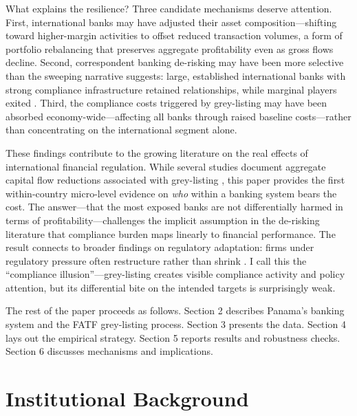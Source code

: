 \documentclass[12pt]{article}
\begin{document}
What explains the resilience? Three candidate mechanisms deserve attention. First, international banks may have adjusted their asset composition---shifting toward higher-margin activities to offset reduced transaction volumes, a form of portfolio rebalancing that preserves aggregate profitability even as gross flows decline. Second, correspondent banking de-risking may have been more selective than the sweeping narrative suggests: large, established international banks with strong compliance infrastructure retained relationships, while marginal players exited \citep{erbenova2016,accuity2017}. Third, the compliance costs triggered by grey-listing may have been absorbed economy-wide---affecting all banks through raised baseline costs---rather than concentrating on the international segment alone.

These findings contribute to the growing literature on the real effects of international financial regulation. While several studies document aggregate capital flow reductions associated with grey-listing \citep{nkusu2023,collin2022,johannesen2014,masciandaro2022}, this paper provides the first within-country micro-level evidence on \textit{who} within a banking system bears the cost. The answer---that the most exposed banks are not differentially harmed in terms of profitability---challenges the implicit assumption in the de-risking literature that compliance burden maps linearly to financial performance. The result connects to broader findings on regulatory adaptation: firms under regulatory pressure often restructure rather than shrink \citep{acharya2014,dagher2020,laeven2016}. I call this the ``compliance illusion''---grey-listing creates visible compliance activity and policy attention, but its differential bite on the intended targets is surprisingly weak.

The rest of the paper proceeds as follows. Section 2 describes Panama's banking system and the FATF grey-listing process. Section 3 presents the data. Section 4 lays out the empirical strategy. Section 5 reports results and robustness checks. Section 6 discusses mechanisms and implications.


\section{Institutional Background}
\end{document}
